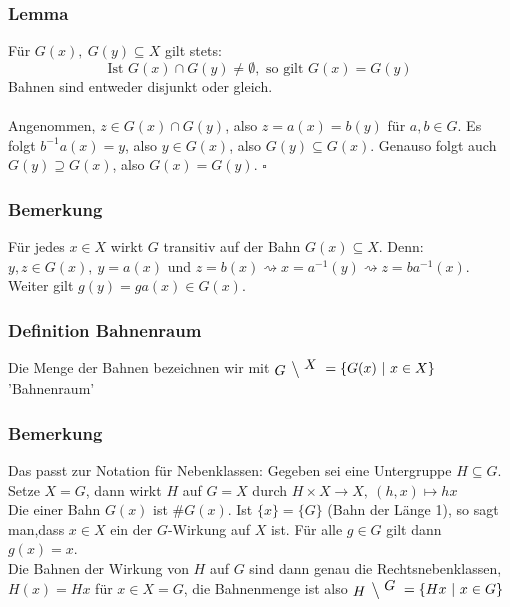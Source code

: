 \subsubsection*{Lemma}
Für  $G(x),~G(y)\subseteq X$ gilt stets:\[ \text{Ist } G(x)\cap G(y)\not=\emptyset, \text{ so gilt } G(x)=G(y)\]
Bahnen sind entweder disjunkt oder gleich.\\

\\
Angenommen, $z\in G(x)\cap G(y)$, also $z=a(x)=b(y)$ für $a,b\in G$. Es folgt $b^{-1}a(x)=y$, also $y\in G(x)$, also $G(y)\subseteq G(x)$. Genauso folgt auch $G(y)\supseteq G(x)$, also $G(x)=G(y)$.
\hfill $\square$

\subsubsection*{Bemerkung}
Für jedes $x\in X$ wirkt $G$ transitiv auf der Bahn $G(x)\subseteq X$. Denn: $y,z\in G(x),~y=a(x)$ und $z=b(x)\rightsquigarrow x=a^{-1}(y) \rightsquigarrow z=ba^{-1}(x)$. Weiter gilt $g(y)=ga(x)\in G(x)$.
\subsubsection*{Definition Bahnenraum}
Die Menge der Bahnen bezeichnen wir mit $\xfrac{G}{X}=\{G(x)~|~x\in X \}$ 'Bahnenraum'
\subsubsection*{Bemerkung}
Das passt zur Notation für Nebenklassen: Gegeben sei eine Untergruppe $H\subseteq G$. Setze $X=G$, dann wirkt $H$ auf $G=X$ durch $H\times X\to X,~(h,x)\mapsto hx$\\
Die  einer Bahn $G(x)$ ist $\#G(x)$. Ist $\{x\}=\{G\}$ (Bahn der Länge 1), so sagt man,dass $x\in X$ ein  der $G$-Wirkung auf $X$ ist. Für alle $g\in G$ gilt dann $g(x)=x$.\\
Die Bahnen der Wirkung von $H$ auf $G$ sind dann genau die Rechtsnebenklassen, $H(x)=Hx$ für $x\in X=G$, die Bahnenmenge ist also $\xfrac{H}{G}=\{Hx~|~x\in G\}$


